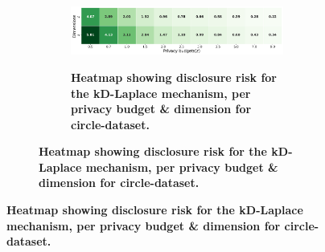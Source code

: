 \newpage
\begin{figure}
    \centering
    \begin{subfigure}[b]{0.85\textwidth}
        \begin{subfigure}[c]{1\textwidth}
            \caption{\textbf{Heatmap showing disclosure risk for the kD-Laplace mechanism, per privacy budget \& dimension for circle-dataset.}}
            \includegraphics[width=1\textwidth]{Results/kd-laplace/kd-Laplace/circle-dataset/distance.png}
            \label{fig:privacy-risk_circle-dataset_adversial_advantage_kd-laplace}
        \end{subfigure}
        \vfill %


\end{subfigure}
\end{figure}
